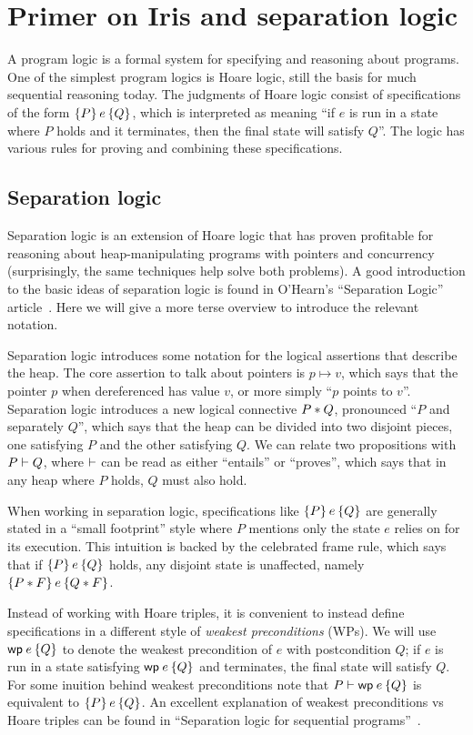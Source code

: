 \section{Primer on Iris and separation logic}

A program logic is a formal system for specifying and reasoning about programs.
One of the simplest program logics is Hoare logic, still the basis for much
sequential reasoning today. The judgments of Hoare logic consist of
specifications of the form $\hoare{P}{e}{Q}$, which is interpreted as meaning
``if $e$ is run in a state where $P$ holds and it terminates, then the final
state will satisfy $Q$''. The logic has various rules for proving and combining
these specifications.

\subsection{Separation logic}

Separation logic is an extension of Hoare logic that has proven profitable for
reasoning about heap-manipulating programs with pointers and concurrency
(surprisingly, the same techniques help solve both problems). A good
introduction to the basic ideas of separation logic is found in O'Hearn's
``Separation Logic'' article~\cite{ohearn:seplogic}. Here we will give a more
terse overview to introduce the relevant notation.

Separation logic introduces some notation for the logical assertions that
describe the heap. The core assertion to talk about pointers is $p \mapsto v$,
which says that the pointer $p$ when dereferenced has value $v$, or more simply
``$p$ points to $v$''. Separation logic introduces a new logical connective
$P * Q$, pronounced ``$P$ and separately $Q$'', which says that the heap can
be divided into two disjoint pieces, one satisfying $P$ and the other satisfying
$Q$. We can relate two propositions with $P \vdash Q$, where $\vdash$ can be
read as either ``entails'' or ``proves'', which says that in any heap where $P$
holds, $Q$ must also hold.

When working in separation logic, specifications like $\hoare{P}{e}{Q}$ are
generally stated in a ``small footprint'' style where $P$ mentions only the
state $e$ relies on for its execution. This intuition is backed by the
celebrated frame rule, which says that if $\hoare{P}{e}{Q}$ holds, any disjoint
state is unaffected, namely $\hoare{P \sep F}{e}{Q \sep F}$.

Instead of working with Hoare triples, it is convenient to instead define
specifications in a different style of \emph{weakest preconditions} (WPs). We will use
$\wpre{e}{Q}$ to denote the weakest precondition of $e$ with postcondition $Q$;
if $e$ is run in a state satisfying $\wpre{e}{Q}$ and terminates, the final
state will satisfy $Q$. For some inuition behind weakest preconditions note that
$P \proves \wpre{e}{Q}$ is equivalent to $\hoare{P}{e}{Q}$. An excellent
explanation of weakest preconditions vs Hoare triples can be found in
``Separation logic for sequential programs''~\cite{chargueraud:seq-seplogic}.

